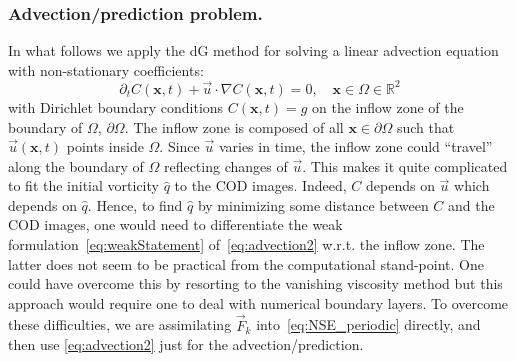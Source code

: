 \documentclass[onecolumn, 12pt, conference]{ieeeconf}
\def\F{\vec{F}}
\renewcommand{\u}{\vec{u}}
\begin{document}
\subsubsection{Advection/prediction problem.}
\label{sec:dG}
In what follows we apply the dG method for solving a linear advection equation with non-stationary coefficients:
\begin{equation}
\label{eq:advection2}
\partial_t C(\bm{x},t)+ \u \cdot \nabla C(\bm{x},t)=0, \quad \bm{x} \in \Omega \in \mathbb{R}^2
\end{equation}
with Dirichlet boundary conditions $C(\bm{x},t)=g$ on the inflow zone of the boundary of $\Omega$, $\partial\Omega$. The inflow zone is composed of all $\bm{x}\in \partial\Omega$ such that $\u(\bm{x},t)$ points inside $\Omega$. Since $\u$ varies in time, the inflow zone could ``travel'' along the boundary of $\Omega$ reflecting changes of $\u$. This makes it quite complicated to fit the initial vorticity $\hat q$ to the COD images. Indeed, $C$ depends on $\u$ which depends on $\hat q$. Hence, to find $\hat q$ by minimizing some distance between $C$ and the COD images, one would need to differentiate the weak formulation~\eqref{eq:weakStatement} of~\eqref{eq:advection2} w.r.t. the inflow zone. The latter does not seem to be practical from the computational stand-point. One could have overcome this by resorting to the vanishing viscosity method but this approach would require one to deal with numerical boundary layers. To overcome these difficulties, we are assimilating $\F_k$ into~\eqref{eq:NSE_periodic} directly, and then use \eqref{eq:advection2} just for the advection/prediction.
\end{document}
